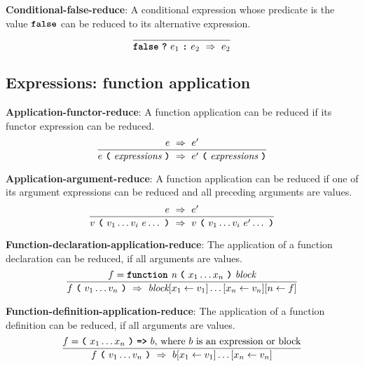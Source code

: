 \vspace{10mm}
\textbf{Conditional-false-reduce}: A conditional
expression whose predicate is the value
$\textbf{\texttt{false}}$
can be reduced to its alternative expression.
\[
\frac{
}{
  \textbf{\texttt{false}}\  \textbf{\texttt{?}}\ e_1\ \textbf{\texttt{:}}\ e_2
  \ \Rightarrow \ 
  e_2
}
\]


\subsection*{Expressions: function application}

\textbf{Application-functor-reduce}: A function application
can be reduced if its functor expression can be reduced.
\[
\frac{
  e \ \Rightarrow \ e'
}{
  e\  \textbf{\texttt{(}}\ \textit{expressions} \ \textbf{\texttt{)}}
  \ \Rightarrow \ 
  e'\  \textbf{\texttt{(}}\ \textit{expressions} \ \textbf{\texttt{)}}
}
\]


\vspace{10mm}
\textbf{Application-argument-reduce}: A function application
can be reduced if one of its argument expressions can be reduced and all
preceding arguments are values.
\[
\frac{
  e \ \Rightarrow \ e'
}{
  v\  \textbf{\texttt{(}}\ v_1 \ldots v_i \ e \ldots\ \textbf{\texttt{)}}
  \ \Rightarrow \ 
  v\  \textbf{\texttt{(}}\ v_1 \ldots v_i \ e' \ldots\ \textbf{\texttt{)}}
}
\]



\vspace{10mm}
\textbf{Function-declaration-application-reduce}:
The application of a function declaration
can be reduced, if all
arguments are values. 
\[
\frac{
  f = \textbf{\texttt{function}}\  \textit{n} \ 
                 \textbf{\texttt{(}}\  x_1 \ldots x_n
                 \ \textbf{\texttt{)}}\ \textit{block}
}{
  f\ \textbf{\texttt{(}}\ v_1 \ldots v_n\ \textbf{\texttt{)}}
  \ \Rightarrow \ 
  \textit{block} [x_1 \leftarrow v_1]\ldots[x_n \leftarrow v_n]
  [n \leftarrow f]
}
\]

\vspace{10mm}
\textbf{Function-definition-application-reduce}:
The application of a function definition
can be reduced, if all
arguments are values. 
\[
\frac{
  f = \textbf{\texttt{(}}\  x_1 \ldots x_n
                 \ \textbf{\texttt{)}}\ \textbf{\texttt{=>}}\ b
                   \mbox{, where $b$ is an expression or block}
}{
  f\ \textbf{\texttt{(}}\ v_1 \ldots v_n\ \textbf{\texttt{)}}
  \ \Rightarrow \ 
  b [x_1 \leftarrow v_1]\ldots[x_n \leftarrow v_n]
}
\]






    
